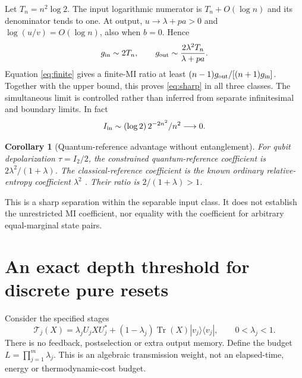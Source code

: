 \documentclass[11pt]{article}
\newtheorem{corollary}[theorem]{Corollary}
\newcommand{\Tr}{\operatorname{Tr}}
\newcommand{\ket}[1]{|#1\rangle}
\newcommand{\bra}[1]{\langle#1|}
\begin{document}
Let $T_n=n^2\log2$. The input logarithmic numerator is $T_n+O(\log n)$ and its denominator tends to one. At output, $u\to\lambda+pa>0$ and $\log(u/v)=O(\log n)$, also when $b=0$. Hence
\[
 g_{\rm in}\sim2T_n,\qquad
 g_{\rm out}\sim\frac{2\lambda^2T_n}{\lambda+pa}.
\]
Equation \eqref{eq:finite} gives a finite-MI ratio at least $(n-1)g_{\rm out}/[(n+1)g_{\rm in}]$. Together with the upper bound, this proves \eqref{eq:sharp} in all three classes. The simultaneous limit is controlled rather than inferred from separate infinitesimal and boundary limits. In fact
\[
 I_{\rm in}\sim(\log2)\,2^{-2n^2}/n^2\longrightarrow0.
\]

\begin{corollary}[Quantum-reference advantage without entanglement]
For qubit depolarization $\tau=I_2/2$, the constrained quantum-reference coefficient is $2\lambda^2/(1+\lambda)$. The classical-reference coefficient is the known ordinary relative-entropy coefficient $\lambda^2$ \cite{hrf,conditional}. Their ratio is $2/(1+\lambda)>1$.
\end{corollary}
This is a sharp separation within the separable input class. It does not establish the unrestricted MI coefficient, nor equality with the coefficient for arbitrary equal-marginal state pairs.

\section{An exact depth threshold for discrete pure resets}
Consider the specified stages
\begin{equation}\label{eq:stages}
 \mathcal T_j(X)=\lambda_j U_j XU_j^*+(1-\lambda_j)\Tr(X)\ket{v_j}\bra{v_j},
 \qquad 0<\lambda_j<1.
\end{equation}
There is no feedback, postselection or extra output memory. Define the budget $L=\prod_{j=1}^m\lambda_j$. This is an algebraic transmission weight, not an elapsed-time, energy or thermodynamic-cost budget.
\end{document}
